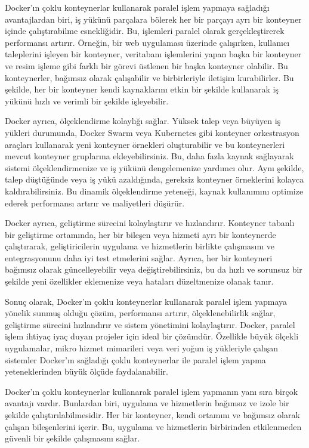 Docker'ın çoklu konteynerlar kullanarak paralel işlem yapmaya sağladığı avantajlardan biri, iş yükünü parçalara bölerek her bir parçayı ayrı bir konteyner içinde çalıştırabilme esnekliğidir. Bu, işlemleri paralel olarak gerçekleştirerek performansı artırır. Örneğin, bir web uygulaması üzerinde çalışırken, kullanıcı taleplerini işleyen bir konteyner, veritabanı işlemlerini yapan başka bir konteyner ve resim işleme gibi farklı bir görevi üstlenen bir başka konteyner olabilir. Bu konteynerler, bağımsız olarak çalışabilir ve birbirleriyle iletişim kurabilirler. Bu şekilde, her bir konteyner kendi kaynaklarını etkin bir şekilde kullanarak iş yükünü hızlı ve verimli bir şekilde işleyebilir.

Docker ayrıca, ölçeklendirme kolaylığı sağlar. Yüksek talep veya büyüyen iş yükleri durumunda, Docker Swarm veya Kubernetes gibi konteyner orkestrasyon araçları kullanarak yeni konteyner örnekleri oluşturabilir ve bu konteynerleri mevcut konteyner gruplarına ekleyebilirsiniz. Bu, daha fazla kaynak sağlayarak sistemi ölçeklendirmenize ve iş yükünü dengelemenize yardımcı olur. Aynı şekilde, talep düştüğünde veya iş yükü azaldığında, gereksiz konteyner örneklerini kolayca kaldırabilirsiniz. Bu dinamik ölçeklendirme yeteneği, kaynak kullanımını optimize ederek performansı artırır ve maliyetleri düşürür.

Docker ayrıca, geliştirme sürecini kolaylaştırır ve hızlandırır. Konteyner tabanlı bir geliştirme ortamında, her bir bileşen veya hizmeti ayrı bir konteynerde çalıştırarak, geliştiricilerin uygulama ve hizmetlerin birlikte çalışmasını ve entegrasyonunu daha iyi test etmelerini sağlar. Ayrıca, her bir konteyneri bağımsız olarak güncelleyebilir veya değiştirebilirsiniz, bu da hızlı ve sorunsuz bir şekilde yeni özellikler eklemenize veya hataları düzeltmenize olanak tanır.

Sonuç olarak, Docker'ın çoklu konteynerlar kullanarak paralel işlem yapmaya yönelik sunmuş olduğu çözüm, performansı artırır, ölçeklenebilirlik sağlar, geliştirme sürecini hızlandırır ve sistem yönetimini kolaylaştırır. 
Docker, paralel işlem  ihtiyaç iyaç duyan projeler için ideal bir çözümdür. Özellikle büyük ölçekli uygulamalar, mikro hizmet mimarileri veya veri yoğun iş yükleriyle çalışan sistemler Docker'ın sağladığı çoklu konteynerlar ile paralel işlem yapma yeteneklerinden büyük ölçüde faydalanabilir.

Docker'ın çoklu konteynerlar kullanarak paralel işlem yapmanın yanı sıra birçok avantajı vardır. Bunlardan biri, uygulama ve hizmetlerin bağımsız ve izole bir şekilde çalıştırılabilmesidir. Her bir konteyner, kendi ortamını ve bağımsız olarak çalışan bileşenlerini içerir. Bu, uygulama ve hizmetlerin birbirinden etkilenmeden güvenli bir şekilde çalışmasını sağlar.

